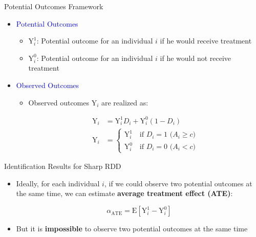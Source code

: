 \documentclass[dvipsnames,hyperref={pdfpagelabels=false}]{beamer}
\begin{document}
\begin{frame}{Potential Outcomes Framework}{}
		\begin{itemize} 
\item \textcolor{blue}{Potential Outcomes} 
		\vspace{0.2cm}
				\begin{itemize} 
		\item $\mathrm{Y}^{1}_{i}$: Potential outcome for an individual $i$ if he would receive treatment
		\vspace{0.2cm}
		\item $\mathrm{Y}^{0}_{i}$: Potential outcome for an individual  $i$ if he would not receive treatment
	\end{itemize}
	\vspace{0.2cm}
	
\item \textcolor{blue}{Observed Outcomes} 
		\vspace{0.2cm}
	\begin{itemize} 
		
		\item Observed outcomes $\mathrm{Y}_i$ are realized as: 
		
		\begin{align*}
		\mathrm{Y}_i&=\mathrm{Y}^{1}_{i}D_i+\mathrm{Y}^{0}_{i}(1-D_i)\\
		\mathrm{Y}_i &= \left\lbrace
		\begin{array}{l}
		\mathrm{Y}^{1}_{i}\quad \text{if $D_i=1$ ($A_i\geq c$)} \\
		\mathrm{Y}^{0}_{i}\quad \text{if $D_i=0$ ($A_i<c$)}
		\end{array} \right.
		\end{align*}
		
		
	\end{itemize}
	\end{itemize}
\end{frame}


\begin{frame}{Identification Results for Sharp RDD}{}
	\begin{itemize}
		
		\item Ideally, for each individual $i$, if we could observe two potential outcomes at the same time, we can estimate \textbf{average treatment effect (ATE)}:
		
		\begin{equation*}
		\alpha_{\text{ATE}}=\mathrm{E}[\mathrm{Y}^{1}_{i}-\mathrm{Y}^{0}_{i}]
		\end{equation*}	
		
		\item But it is \textbf{impossible} to observe two potential outcomes at the same time		
		
	\end{itemize}
\end{frame}
\end{document}
